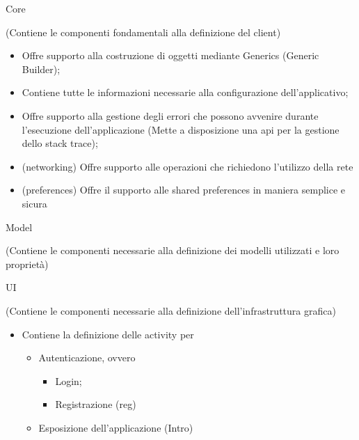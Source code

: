     \begin{minipage}{0.45\textwidth}
      \begin{center}
        {\Huge Core}

        (Contiene le componenti fondamentali alla definizione del client)
      \end{center}
      \vspace{0.5cm}

      \begin{itemize}
        \setlength\itemsep{1em}
        \item {} \rightarrow Offre supporto alla costruzione di oggetti mediante Generics (Generic Builder);
        \item {} \rightarrow Contiene tutte le informazioni necessarie alla configurazione dell'applicativo;
        \item {} \rightarrow Offre supporto alla gestione degli errori che possono avvenire durante l'esecuzione dell'applicazione (Mette a disposizione una api per la gestione dello stack trace);
        \item {} (networking) \rightarrow Offre supporto alle operazioni che richiedono l'utilizzo della rete
        \item {} (preferences) \rightarrow Offre il supporto alle shared preferences in maniera semplice e sicura
      \end{itemize}

      \vspace{1cm}

      \begin{center}
        {\Huge Model}

        (Contiene le componenti necessarie alla definizione dei modelli utilizzati e loro proprietà)
      \end{center}
      \vspace{0.5cm}

      \begin{center}
        {\Huge UI}

        (Contiene le componenti necessarie alla definizione dell’infrastruttura grafica)
      \end{center}
      \vspace{0.5cm}

      \begin{itemize}
        \setlength\itemsep{1em}
        \item {} \rightarrow Contiene la definizione delle activity \footnotemark {} per \begin{itemize} \item Autenticazione, ovvero \begin{itemize} \item Login; \item Registrazione (reg) \end{itemize} \item Esposizione dell'applicazione (Intro) \end{itemize}


\end{itemize}
\end{minipage}
